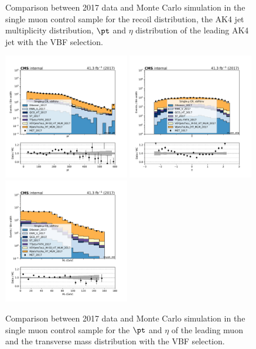 {\begin{figure}[htbp]
\begin{center}
    \end{center}
    \caption{Comparison between 2017 data and Monte Carlo simulation in the single muon control sample for
        the recoil distribution, the AK4 jet multiplicity distribution,  $\pt$ and $\eta$ distribution
        of the leading AK4 jet with the VBF selection.}
    \label{fig:SM_vbfhinv_2017}
\end{figure}

\begin{figure}[htbp]
    \begin{center}
        \includegraphics[width=0.49\textwidth]{fig/datamc/cr_1m_vbf/cr_1m_vbf_muon_pt_losf_2017.pdf}
        \includegraphics[width=0.49\textwidth]{fig/datamc/cr_1m_vbf/cr_1m_vbf_muon_eta_losf_2017.pdf} \\
        \includegraphics[width=0.49\textwidth]{fig/datamc/cr_1m_vbf/cr_1m_vbf_muon_mt_losf_2017.pdf}
    \end{center}
    \caption{Comparison between 2017 data and Monte Carlo simulation in the single muon control sample for
        the $\pt$ and $\eta$ of the leading muon and the transverse mass distribution with the VBF selection.}
    \label{fig:SM_2_vbfhinv_2017}
\end{figure}

}
